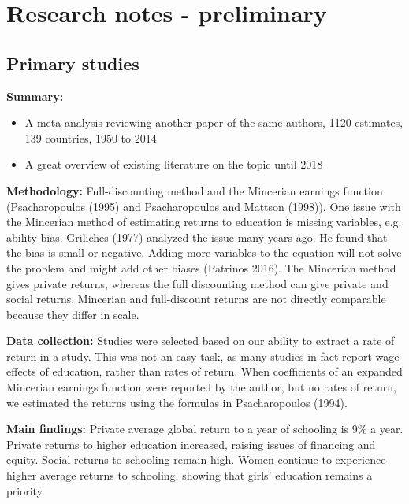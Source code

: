 \chapter{Research notes - preliminary}
\label{research_notes}

\section*{Primary studies}

{\center\large\cite{psacharopoulos2018returns}\par}

\textbf{Summary:} 
\begin{itemize}
    \item A meta-analysis reviewing another paper of the same authors, 1120 estimates, 139 countries, 1950 to 2014
    \item A great overview of existing literature on the topic until 2018
\end{itemize}

\textbf{Methodology:} Full-discounting method and the Mincerian earnings function (Psacharopoulos
    (1995) and Psacharopoulos and Mattson (1998)). One issue with the Mincerian method of estimating
    returns to education is missing variables, e.g. ability bias. Griliches (1977) analyzed the issue
    many years ago. He found that the bias is small or negative. Adding more variables to the equation
    will not solve the problem and might add other biases (Patrinos 2016). The Mincerian method gives private returns, whereas the full discounting method can give private and social returns. Mincerian and full-discount returns are not directly comparable because they differ in scale.

\textbf{Data collection:} Studies were selected based on our ability to extract a rate of
    return in a study. This was not an easy task, as many studies in fact report wage effects of education, rather than rates of return. When coefficients of an expanded Mincerian earnings function were reported by the author, but no rates of return, we estimated the returns using the formulas in Psacharopoulos (1994).

\textbf{Main findings:} Private average global return to a year of schooling is 9\% a year. Private
returns to higher education increased, raising issues of financing and
equity. Social returns to schooling remain high. Women continue to
experience higher average returns to schooling, showing that girls'
education remains a priority.

